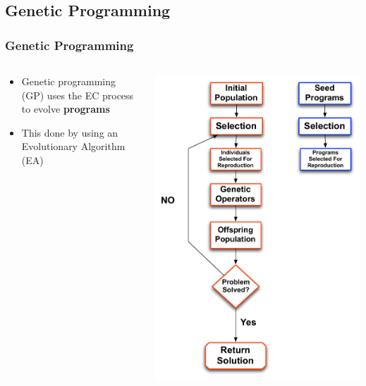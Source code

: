 \documentclass{beamer}
\begin{document}
\subsection[Genetic Programming]{Genetic Programming}
\begin{frame}
	\frametitle{Genetic Programming}
\begin{columns}[T]
\begin{column}{0.5\textwidth}
\begin{itemize}	
	\item Genetic programming (GP) uses the EC process to evolve \textbf{programs}
	\item This done by using an Evolutionary Algorithm (EA)
	
	
\end{itemize}
\end{column}
\begin{column}{0.5\textwidth}
   \includegraphics[height=0.85\textheight]{Illustrations/GP2.pdf}

\end{column}
\end{columns}
\end{frame}
\end{document}
